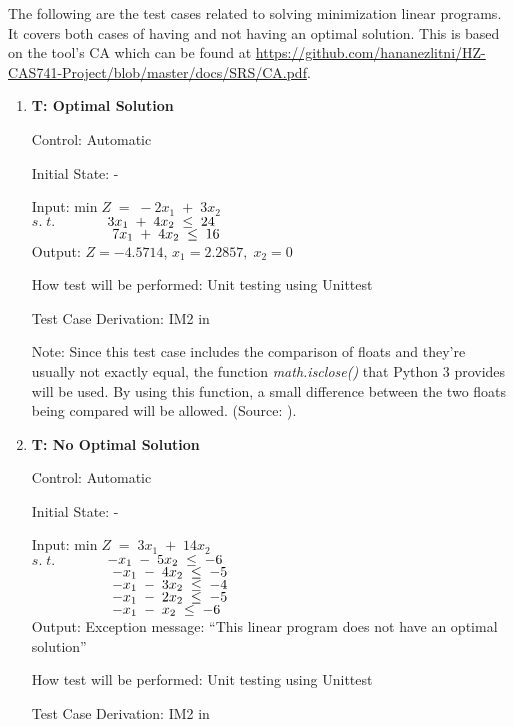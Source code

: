 \documentclass[12pt, titlepage]{article}
\newcounter{testnum} %
\begin{document}
The following are the test cases related to solving minimization linear 
programs. It covers both cases of having and not having an optimal solution. 
This is based on the tool's CA which can be found at 
\url{https://github.com/hananezlitni/HZ-CAS741-Project/blob/master/docs/SRS/CA.pdf}.

\begin{enumerate}
	\item{\textbf{T\thetestnum \label{Min_Opt}: Optimal 
	Solution}}
	
	Control: Automatic 
	
	Initial State: -
	
	Input: min$\;Z\;=\;-2x_1\;+\;3x_2$\\
	$s.\;t.$$\hspace*{1.3cm} 3x_1\;+\;4x_2\; \leq \;24$\\
	$\hspace*{2cm} 7x_1\;+\;4x_2\; \leq \;16$\\
	
	Output: $Z = -4.5714$, $x_1=2.2857,\;x_2=0$
	
	How test will be performed: Unit testing using Unittest
	
	Test Case Derivation: IM2 in \cite{losms-ca}
	
	Note: Since this test case includes the comparison of floats and they're 
	usually not exactly equal, the function \textit{math.isclose()} that Python 
	3 provides will be used. By using this function, a small difference between 
	the two floats being compared will be allowed. (Source: \cite{python3-doc}).
	
	\item{\textbf{T\thetestnum \label{Min_NoOpt}: No 
	Optimal Solution}}
	
	Control: Automatic 
	
	Initial State: -
	
	Input: min$\;Z\;=\;3x_1\;+\;14x_2$\\
	$s.\;t.$$\hspace*{1.3cm} -x_1\;-\;5x_2\; \leq \;-6$\\
	$\hspace*{2cm} -x_1\;-\;4x_2\; \leq \;-5$\\
	$\hspace*{2cm} -x_1\;-\;3x_2\; \leq \;-4$\\
	$\hspace*{2cm} -x_1\;-\;2x_2\; \leq \;-5$\\
	$\hspace*{2cm} -x_1\;-\;x_2\; \leq \;-6$\\
	
	Output: Exception message: ``This linear program does not have an optimal 
	solution''
	
	How test will be performed: Unit testing using Unittest
	
	Test Case Derivation: IM2 in \cite{losms-ca}
\end{enumerate}
\end{document}
